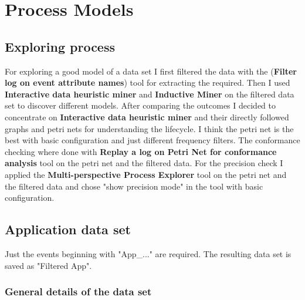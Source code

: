 \section{Process Models}

\subsection{Exploring process}

For exploring a good model of a data set I first filtered the data with the (\textbf{Filter log on event attribute names}) tool for extracting the required. Then I used \textbf{Interactive data heuristic miner} and \textbf{Inductive Miner} on the filtered data set to discover different models. After comparing the outcomes I decided to concentrate on \textbf{Interactive data heuristic miner} and their directly followed graphs and petri nets for understanding the lifecycle. I think the petri net is the best with basic configuration and just different frequency filters. The conformance checking where done with \textbf{Replay a log on Petri Net for conformance analysis} tool on the petri net and the filtered data. For the precision check I applied the \textbf{Multi-perspective Process Explorer} tool on the petri net and the filtered data and chose "show precision mode" in the tool with basic configuration.

\subsection{Application data set}
Just the events beginning with "App\_..." are required. The resulting data set is saved as "Filtered App".

\subsubsection{General details of the data set}

